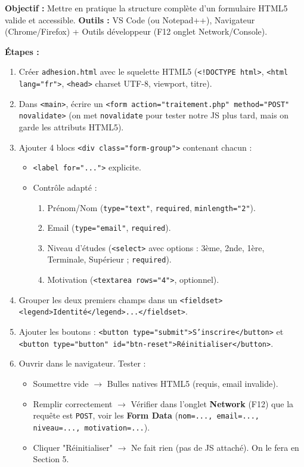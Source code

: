 \documentclass[11pt]{article}
\begin{document}
\begin{experience}
\textbf{Objectif :} Mettre en pratique la structure complète d'un formulaire HTML5 valide et accessible.
\textbf{Outils :} VS Code (ou Notepad++), Navigateur (Chrome/Firefox) + Outils développeur (F12 onglet Network/Console).

\textbf{Étapes :}
\begin{enumerate}
    \item Créer \texttt{adhesion.html} avec le squelette HTML5 (\texttt{<!DOCTYPE html>}, \texttt{<html lang="fr">}, \texttt{<head>} charset UTF-8, viewport, titre).
    \item Dans \texttt{<main>}, écrire un \texttt{<form action="traitement.php" method="POST" novalidate>} (on met \texttt{novalidate} pour tester notre JS plus tard, mais on garde les attributs HTML5).
    \item Ajouter 4 blocs \texttt{<div class="form-group">} contenant chacun :
    \begin{itemize}
        \item \texttt{<label for="...">} explicite.
        \item Contrôle adapté :
        \begin{enumerate}
            \item Prénom/Nom (\texttt{type="text"}, \texttt{required}, \texttt{minlength="2"}).
            \item Email (\texttt{type="email"}, \texttt{required}).
            \item Niveau d'études (\texttt{<select>} avec options : 3ème, 2nde, 1ère, Terminale, Supérieur ; \texttt{required}).
            \item Motivation (\texttt{<textarea rows="4">}, optionnel).
        \end{enumerate}
    \end{itemize}
    \item Grouper les deux premiers champs dans un \texttt{<fieldset><legend>Identité</legend>...</fieldset>}.
    \item Ajouter les boutons : \texttt{<button type="submit">S'inscrire</button>} et \texttt{<button type="button" id="btn-reset">Réinitialiser</button>}.
    \item Ouvrir dans le navigateur. Tester :
    \begin{itemize}
        \item Soumettre vide $\rightarrow$ Bulles natives HTML5 (requis, email invalide).
        \item Remplir correctement $\rightarrow$ Vérifier dans l'onglet \textbf{Network} (F12) que la requête est \texttt{POST}, voir les \textbf{Form Data} (\texttt{nom=..., email=..., niveau=..., motivation=...}).
        \item Cliquer "Réinitialiser" $\rightarrow$ Ne fait rien (pas de JS attaché). On le fera en Section 5.
    \end{itemize}
\end{enumerate}


\end{experience}
\end{document}
